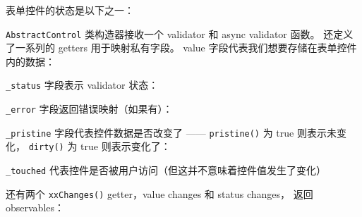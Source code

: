 表单控件的状态是以下之一：




\texttt{AbstractControl} 类构造器接收一个 validator 和 async validator 函数。
还定义了一系列的 getters 用于映射私有字段。
value 字段代表我们想要存储在表单控件内的数据：




\texttt{\_status} 字段表示 validator 状态：




\texttt{\_error} 字段返回错误映射（如果有）：




\texttt{\_pristine} 字段代表控件数据是否改变了 —— \texttt{pristine()} 为 true 则表示未变化，
\texttt{dirty()} 为 true 则表示变化了：




\texttt{\_touched} 代表控件是否被用户访问（但这并不意味着控件值发生了变化）




还有两个 \texttt{xxChanges()} getter，value changes 和 status changes，
返回 observables：




